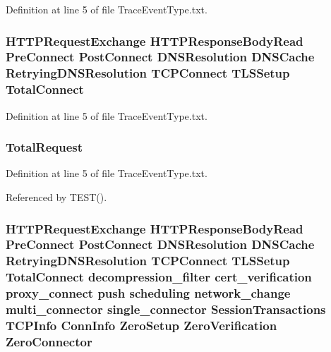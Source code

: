 Definition at line 5 of file Trace\+Event\+Type.\+txt.

\subsubsection[{Total\+Connect}]{ H\+T\+T\+P\+Request\+Exchange H\+T\+T\+P\+Response\+Body\+Read {\bf Pre\+Connect} {\bf Post\+Connect} D\+N\+S\+Resolution D\+N\+S\+Cache Retrying\+D\+N\+S\+Resolution T\+C\+P\+Connect T\+L\+S\+Setup Total\+Connect}\label{TraceEventType_8txt_a5b865798fbf9e11d8c0d113612b8db93}


Definition at line 5 of file Trace\+Event\+Type.\+txt.

\subsubsection[{Total\+Request}]{\setlength{\rightskip}{0pt plus 5cm}Total\+Request}\label{TraceEventType_8txt_af36c8d3add46fdf6ac6a09ee5fa3b45b}


Definition at line 5 of file Trace\+Event\+Type.\+txt.



Referenced by T\+E\+S\+T().

\subsubsection[{Zero\+Connector}]{ H\+T\+T\+P\+Request\+Exchange H\+T\+T\+P\+Response\+Body\+Read {\bf Pre\+Connect} {\bf Post\+Connect} D\+N\+S\+Resolution D\+N\+S\+Cache Retrying\+D\+N\+S\+Resolution T\+C\+P\+Connect T\+L\+S\+Setup {\bf Total\+Connect} decompression\+\_\+filter cert\+\_\+verification proxy\+\_\+connect push scheduling network\+\_\+change multi\+\_\+connector single\+\_\+connector {\bf Session\+Transactions} {\bf T\+C\+P\+Info} {\bf Conn\+Info} {\bf Zero\+Setup} {\bf Zero\+Verification} Zero\+Connector}\label{TraceEventType_8txt_a2fb309c6134f638648f2f940d1c3064d}


